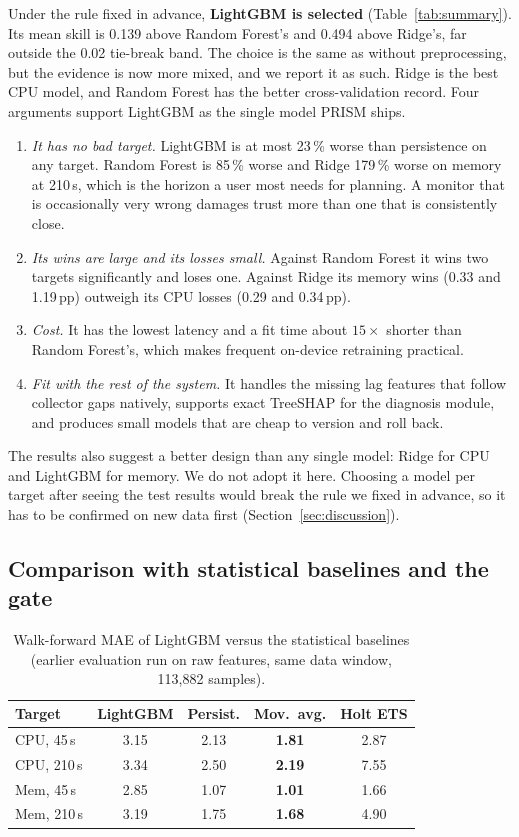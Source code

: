 \documentclass[conference]{IEEEtran}
\newcommand{\pp}{\,pp}
\begin{document}
Under the rule fixed in advance, \textbf{LightGBM is selected}
(Table~\ref{tab:summary}). Its mean skill is 0.139 above Random Forest's and
0.494 above Ridge's, far outside the 0.02 tie-break band. The choice is the
same as without preprocessing, but the evidence is now more mixed, and we
report it as such. Ridge is the best CPU model, and Random Forest has the
better cross-validation record. Four arguments support LightGBM as the
single model PRISM ships.
\begin{enumerate}
  \item \emph{It has no bad target.} LightGBM is at most 23\,\% worse than
        persistence on any target. Random Forest is 85\,\% worse and Ridge
        179\,\% worse on memory at 210\,s, which is the horizon a user most
        needs for planning. A monitor that is occasionally very wrong damages
        trust more than one that is consistently close.
  \item \emph{Its wins are large and its losses small.} Against Random
        Forest it wins two targets significantly and loses one. Against Ridge
        its memory wins (0.33 and 1.19\pp) outweigh its CPU losses (0.29 and
        0.34\pp).
  \item \emph{Cost.} It has the lowest latency and a fit time about
        $15\times$ shorter than Random Forest's, which makes frequent
        on-device retraining practical.
  \item \emph{Fit with the rest of the system.} It handles the missing lag
        features that follow collector gaps natively, supports exact TreeSHAP
        for the diagnosis module, and produces small models that are cheap to
        version and roll back.
\end{enumerate}
The results also suggest a better design than any single model: Ridge for CPU
and LightGBM for memory. We do not adopt it here. Choosing a model per target
after seeing the test results would break the rule we fixed in advance, so it
has to be confirmed on new data first (Section~\ref{sec:discussion}).

\subsection{Comparison with statistical baselines and the gate}

\begin{table}[t]
\centering
\caption{Walk-forward MAE of LightGBM versus the statistical baselines
(earlier evaluation run on raw features, same data window, 113{,}882 samples).}
\label{tab:baselines}
\begin{tabular}{@{}lcccc@{}}
\toprule
Target & LightGBM & Persist. & Mov.\ avg. & Holt ETS \\
\midrule
CPU, 45\,s  & 3.15 & 2.13 & \textbf{1.81} & 2.87 \\
CPU, 210\,s & 3.34 & 2.50 & \textbf{2.19} & 7.55 \\
Mem, 45\,s  & 2.85 & 1.07 & \textbf{1.01} & 1.66 \\
Mem, 210\,s & 3.19 & 1.75 & \textbf{1.68} & 4.90 \\
\bottomrule
\end{tabular}
\end{table}
\end{document}
